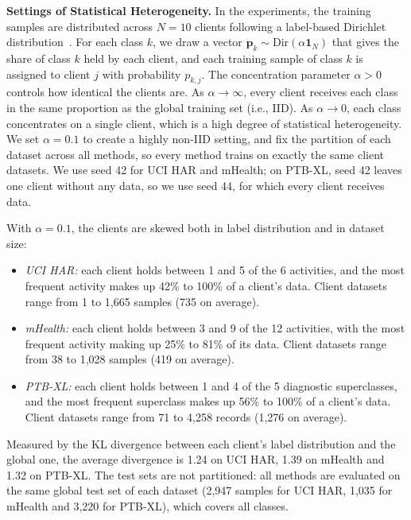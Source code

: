 \documentclass[sigconf]{acmart}
\begin{document}
\textbf{Settings of Statistical Heterogeneity.}
In the experiments, the training samples are distributed across $N = 10$ clients following a label-based Dirichlet distribution~\cite{hsu2019measuring}. For each class $k$, we draw a vector $\mathbf{p}_k \sim \mathrm{Dir}(\alpha\mathbf{1}_N)$ that gives the share of class $k$ held by each client, and each training sample of class $k$ is assigned to client $j$ with probability $p_{k,j}$. The concentration parameter $\alpha > 0$ controls how identical the clients are. As $\alpha \to \infty$, every client receives each class in the same proportion as the global training set (i.e., IID). As $\alpha \to 0$, each class concentrates on a single client, which is a high degree of statistical heterogeneity. We set $\alpha = 0.1$ to create a highly non-IID setting, and fix the partition of each dataset across all methods, so every method trains on exactly the same client datasets. We use seed 42 for UCI HAR and mHealth; on PTB-XL, seed 42 leaves one client without any data, so we use seed 44, for which every client receives data.

With $\alpha = 0.1$, the clients are skewed both in label distribution and in dataset size:
\begin{itemize}
  \item \textit{UCI HAR:} each client holds between 1 and 5 of the 6 activities, and the most frequent activity makes up 42\% to 100\% of a client's data. Client datasets range from 1 to 1,665 samples (735 on average).
  \item \textit{mHealth:} each client holds between 3 and 9 of the 12 activities, with the most frequent activity making up 25\% to 81\% of its data. Client datasets range from 38 to 1,028 samples (419 on average).
  \item \textit{PTB-XL:} each client holds between 1 and 4 of the 5 diagnostic superclasses, and the most frequent superclass makes up 56\% to 100\% of a client's data. Client datasets range from 71 to 4,258 records (1,276 on average).
\end{itemize}
Measured by the KL divergence between each client's label distribution and the global one, the average divergence is 1.24 on UCI HAR, 1.39 on mHealth and 1.32 on PTB-XL. The test sets are not partitioned: all methods are evaluated on the same global test set of each dataset (2,947 samples for UCI HAR, 1,035 for mHealth and 3,220 for PTB-XL), which covers all classes.
\end{document}
